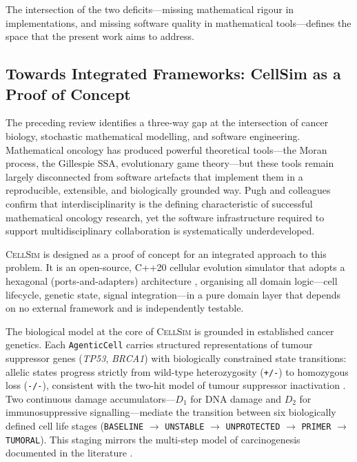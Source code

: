 \documentclass[12pt,a4paper]{article}
\begin{document}
The intersection of the two deficits---missing mathematical rigour in
implementations, and missing software quality in mathematical tools---defines
the space that the present work aims to address.

\subsection{Towards Integrated Frameworks: CellSim as a Proof of Concept}
\label{subsec:cellsim}

The preceding review identifies a three-way gap at the intersection of cancer
biology, stochastic mathematical modelling, and software engineering.
Mathematical oncology has produced powerful theoretical tools---the Moran process,
the Gillespie SSA, evolutionary game theory---but these tools remain largely
disconnected from software artefacts that implement them in a reproducible,
extensible, and biologically grounded way.
Pugh and colleagues \cite{pugh2025} confirm that interdisciplinarity is the
defining characteristic of successful mathematical oncology research, yet the
software infrastructure required to support multidisciplinary collaboration is
systematically underdeveloped.

\textsc{CellSim} is designed as a proof of concept for an integrated approach
to this problem.
It is an open-source, C++20 cellular evolution simulator that adopts a
hexagonal (ports-and-adapters) architecture \cite{thomas2003}, organising all
domain logic---cell lifecycle, genetic state, signal integration---in a pure
domain layer that depends on no external framework and is independently testable.

The biological model at the core of \textsc{CellSim} is grounded in established
cancer genetics.
Each \texttt{AgenticCell} carries structured representations of tumour suppressor
genes (\textit{TP53}, \textit{BRCA1}) with biologically constrained state
transitions: allelic states progress strictly from wild-type heterozygosity
(\texttt{+/-}) to homozygous loss (\texttt{-/-}), consistent with the two-hit
model of tumour suppressor inactivation \cite{veneziano2025}.
Two continuous damage accumulators---$D_1$ for DNA damage and $D_2$ for
immunosuppressive signalling---mediate the transition between six
biologically defined cell life stages (\texttt{BASELINE} $\to$ \texttt{UNSTABLE}
$\to$ \texttt{UNPROTECTED} $\to$ \texttt{PRIMER} $\to$ \texttt{TUMORAL}).
This staging mirrors the multi-step model of carcinogenesis documented in the
literature \cite{chauviere2010, veneziano2025}.
\end{document}
